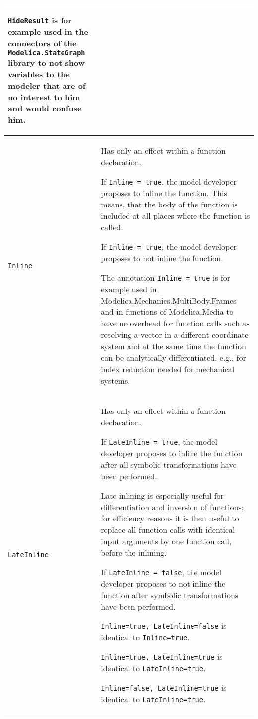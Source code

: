 \begin{longtable}[]{|p{4.2cm}|p{10cm}|}
\begin{nonnormative}
\lstinline!HideResult! is for example used in the connectors of the
\lstinline!Modelica.StateGraph! library to not show variables to the modeler
that are of no interest to him and would confuse him.
\end{nonnormative}
\\ \hline
\lstinline!Inline! &
Has only an effect within a function declaration.

If \lstinline!Inline = true!, the model developer proposes to inline the
function. This means, that the body of the function is included at all
places where the function is called.

If \lstinline!Inline = true!, the model developer proposes to not inline the
function.

\begin{nonnormative}
The annotation \lstinline!Inline = true! is for example used in
Modelica\allowbreak{}.Mechanics\allowbreak{}.MultiBody\allowbreak{}.Frames and in functions of
Modelica\allowbreak{}.Media to have no overhead for function calls such as
resolving a vector in a different coordinate system and at the same time
the function can be analytically differentiated, e.g., for index
reduction needed for mechanical systems.
\end{nonnormative}
\\ \hline
\lstinline!LateInline!
&
Has only an effect within a function declaration.

If \lstinline!LateInline = true!, the model developer proposes to inline the
function after all symbolic transformations have been performed.

\begin{nonnormative}
Late inlining is especially useful for differentiation and inversion of functions;
for efficiency reasons it is then useful to replace all function calls with
identical input arguments by one function call, before the inlining.
\end{nonnormative}

If \lstinline!LateInline = false!, the model developer proposes to not inline
the function after symbolic transformations have been performed.

\lstinline!Inline=true, LateInline=false! is identical to \lstinline!Inline=true!.

\lstinline!Inline=true, LateInline=true! is identical to \lstinline!LateInline=true!.

\lstinline!Inline=false, LateInline=true! is identical to \lstinline!LateInline=true!.


\end{longtable}
